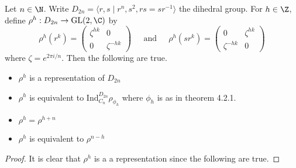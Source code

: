\documentclass[a4paper]{article}
\begin{document}
\begin{prp}{}{} Let $n\in\N$. Write $D_{2n}=\langle r,s\;|\;r^n,s^2,rs=sr^{-1}\rangle$ the dihedral group. For $h\in\Z$, define $\rho^h:D_{2n}\to\text{GL}(2,\C)$ by $$\rho^h(r^k)=\begin{pmatrix}
\zeta^{hk} & 0\\
0 & \zeta^{-hk}
\end{pmatrix}\;\;\;\;\text{ and }\;\;\;\;\rho^h(sr^k)=\begin{pmatrix}
0 & \zeta^{hk}\\
\zeta^{-hk} & 0
\end{pmatrix}$$ where $\zeta=e^{2\pi i/n}$. Then the following are true. 
\begin{itemize}
\item $\rho^h$ is a representation of $D_{2n}$
\item $\rho^h$ is equivalent to $\text{Ind}_{C_n}^{D_{2n}}\rho_{\phi_h}$ where $\phi_h$ is as in theorem 4.2.1.  
\item $\rho^h=\rho^{h+n}$
\item $\rho^h$ is equivalent to $\rho^{n-h}$
\end{itemize} \tcbline
\begin{proof}
It is clear that $\rho^h$ is a a representation since the following are true. 
\end{proof}
\end{prp}
\end{document}

